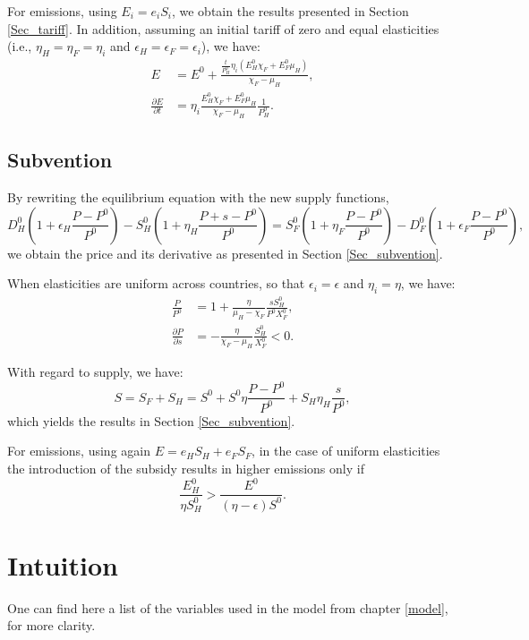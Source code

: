 For emissions, using $E_i = e_i S_i$, we obtain the results presented in Section \ref{Sec_tariff}. In addition, assuming an initial tariff of zero and equal elasticities (i.e., $\eta_H = \eta_F = \eta_i$ and $\epsilon_H = \epsilon_F = \epsilon_i$), we have:
\begin{align*}
E &= E^0 + \frac{\frac{t}{P_H^0} \eta_i (E_H^0 \chi_F + E_F^0 \mu_H)}{\chi_F - \mu_H}, \\[1mm]
\frac{\partial E}{\partial t} &= \eta_i \frac{E_H^0 \chi_F + E_F^0 \mu_H}{\chi_F - \mu_H}\frac{1}{P_H^0}.
\end{align*}

\section{Subvention}\label{appendix:intuitions_subvention}

By rewriting the equilibrium equation with the new supply functions,
$$
D_H^0\left(1+\epsilon_H \frac{P - P^0}{P^0}\right) - S_H^0\left(1+\eta_H \frac{P + s - P^0}{P^0}\right) = S_F^0 \left(1+\eta_F \frac{P - P^0}{P^0}\right) - D_F^0\left(1+\epsilon_F \frac{P - P^0}{P^0}\right),
$$
we obtain the price and its derivative as presented in Section \ref{Sec_subvention}.

When elasticities are uniform across countries, so that $\epsilon_i = \epsilon$ and $\eta_i = \eta$, we have:
\begin{align*}
\frac{P}{P^0} &= 1 + \frac{\eta}{\mu_H - \chi_F} \frac{s S_H^0}{P^0 X_F^0}, \\
\frac{\partial P}{\partial s} &= -\frac{\eta}{\chi_F - \mu_H} \frac{S_H^0}{X_F^0} < 0.
\end{align*}

With regard to supply, we have:
$$
S = S_F + S_H =  S^0 + S^0 \eta \frac{P- P^0}{P^0} + S_H \eta_H \frac{s}{P^0},
$$
which yields the results in Section \ref{Sec_subvention}.

For emissions, using again $E = e_H S_H + e_F S_F$, in the case of uniform elasticities the introduction of the subsidy results in higher emissions only if
$$
\frac{E_H^0}{\eta S_H^0} > \frac{E^0}{(\eta - \epsilon)S^0}.
$$


\chapter{Intuition}\label{appendix:variables}

One can find here a list of the variables used in the model from chapter \ref{model}, for more clarity.

